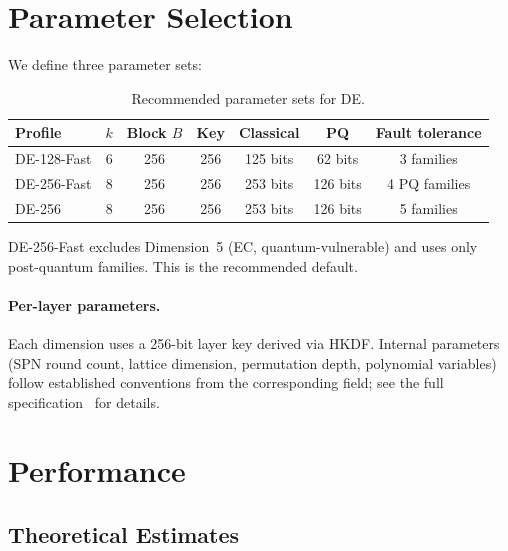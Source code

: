 \documentclass[11pt]{article}
\newcommand{\DE}{\textsf{DE}}
\begin{document}
\section{Parameter Selection}
\label{sec:params}

We define three parameter sets:

\begin{table}[h]
\centering
\caption{Recommended parameter sets for \DE.}
\label{tab:params}
\begin{tabular}{@{}lcccccc@{}}
\toprule
Profile & $k$ & Block $B$ & Key & Classical & PQ & Fault tolerance \\
\midrule
DE-128-Fast & 6 & 256 & 256 & 125 bits & 62 bits & 3 families \\
DE-256-Fast & 8 & 256 & 256 & 253 bits & 126 bits & 4 PQ families \\
DE-256      & 8 & 256 & 256 & 253 bits & 126 bits & 5 families \\
\bottomrule
\end{tabular}
\end{table}

DE-256-Fast excludes Dimension~5 (EC, quantum-vulnerable) and uses only
post-quantum families. This is the recommended default.

\paragraph{Per-layer parameters.}
Each dimension uses a 256-bit layer key derived via HKDF. Internal parameters
(SPN round count, lattice dimension, permutation depth, polynomial variables)
follow established conventions from the corresponding field; see the full
specification~\cite{de-spec} for details.

\section{Performance}
\label{sec:performance}

\subsection{Theoretical Estimates}
\end{document}
